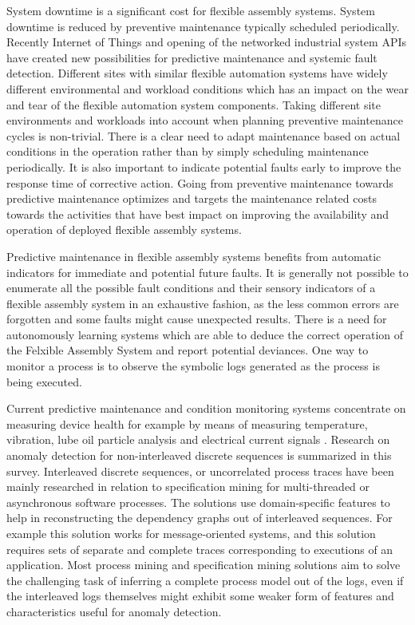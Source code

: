 \documentclass[journal]{IEEEtran}
\begin{document}
System downtime is a significant cost for flexible assembly systems. System downtime is reduced by preventive maintenance typically scheduled periodically.
Recently Internet of Things and opening of the networked industrial system APIs have created new possibilities for predictive maintenance and systemic fault detection. Different sites with similar
flexible automation systems have widely different environmental and workload conditions which has an impact on the wear and tear of the flexible automation system components.
Taking different site environments and workloads into account when planning preventive maintenance cycles is non-trivial. There is a clear need to adapt maintenance based on actual
conditions in the operation rather than by simply scheduling maintenance periodically\cite{hashemian2011state}.
It is also important to indicate potential faults early to improve the response time of corrective action.
Going from preventive maintenance towards predictive maintenance optimizes and targets the maintenance related costs towards the activities that have best impact
on improving the availability and operation of deployed flexible assembly systems.

Predictive maintenance in flexible assembly systems benefits from automatic indicators for immediate and potential future faults.
It is generally not possible to enumerate all the possible fault conditions and their sensory indicators of a flexible assembly system in an exhaustive fashion,
as the less common errors are forgotten and some faults might cause unexpected results\cite{camarinha1996integration}.
There is a need for autonomously learning systems which are able to deduce the correct operation of the Felxible Assembly System and report potential deviances. One way to monitor a process is to observe the symbolic
logs generated as the process is being executed.

Current predictive maintenance and condition monitoring systems concentrate on measuring device health for example by means of measuring temperature\cite{mobley2002introduction},
vibration\cite{scheffer2004practical}, lube oil particle analysis\cite{hunt1993handbook} and electrical current signals
\cite{thomson2001current}. Research on anomaly detection for non-interleaved discrete sequences is summarized in this survey\cite{chandola2012anomaly}.
Interleaved discrete sequences, or uncorrelated process traces have been mainly researched in relation to specification mining for multi-threaded or asynchronous software processes.
The solutions use domain-specific features to help in reconstructing the dependency graphs out of interleaved sequences. For example this solution works for message-oriented systems\cite{kumar2011mining},
and this solution requires sets of separate and complete traces corresponding to executions of an application\cite{mining-program-workflow-from-interleaved-traces}. Most process mining and specification mining
solutions aim to solve the challenging task of inferring a complete process model out of the logs, even if the interleaved logs themselves might exhibit some weaker form of features
and characteristics useful for anomaly detection.
\end{document}
